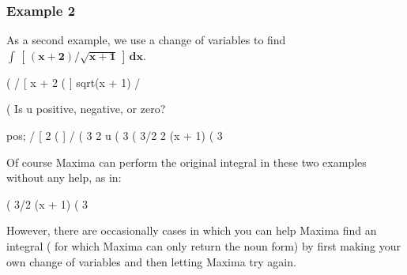 \documentclass[12pt]{article}
\begin{document}
\subsubsection*{Example 2}
As a second example, we use a change of variables
   to find $\mathbf{\int \, \left[ \, (x+2)/\sqrt{x+1}\, \right] \, dx  }$.
\begin{myVerbatim}
(%
                               /
                               [    x + 2
(%
                               ] sqrt(x + 1)
                               /
\end{myVerbatim}
\newpage
\begin{myVerbatim}
(%
Is  u  positive, negative, or zero?

pos;
                                /
                                [     2
(%
                                ]
                                /
(%
                                     3
                                  2 u
(%
                                   3
(%
                                  3/2
                         2 (x + 1)
(%
                              3
\end{myVerbatim} 
Of course Maxima can perform the original integral in these two examples
  without any help, as in:
\begin{myVerbatim}
(%
                                   3/2
                            (x + 1)
(%
                                3
\end{myVerbatim} 
However, there are occasionally cases in which you can help Maxima find an
  integral ( for which Maxima can only return the noun form) by
  first making your own change of variables and then letting Maxima try again.
\end{document}
